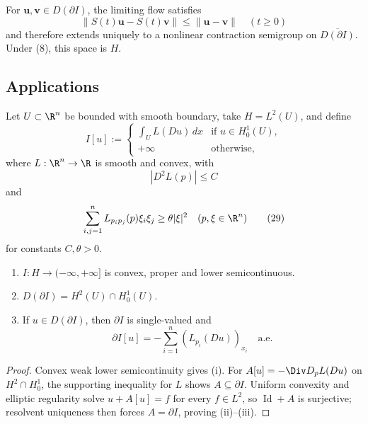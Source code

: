 \begin{remark}
\label{rem:gradient-flow-semigroup-extension}
For $\mathbf u,\mathbf v\in D(\partial I)$, the limiting flow satisfies
\[
\|S(t)\mathbf{u} - S(t)\mathbf{v}\| \leq \|\mathbf{u} - \mathbf{v}\| \quad (t \geq 0)
\]
and therefore extends uniquely to a nonlinear contraction semigroup on $\overline{D(\partial I)}$. Under (8), this space is $H$.
\end{remark}

\subsection{Applications}
\label{sec:gradient-flow-applications}

Let $U\subset\R^n$ be bounded with smooth boundary, take $H=L^2(U)$, and define
\[
I[u]:=
\begin{cases}
\displaystyle\int_U L(Du)\,dx & \text{if }u\in H_0^1(U),\\
+\infty & \text{otherwise},
\end{cases}
\tag{27}
\]
where $L:\R^n\to\R$ is smooth and convex, with
\[
|D^2L(p)|\leq C
\tag{28}
\]
and
\[
\sum_{i,j=1}^nL_{p_ip_j}(p)\xi_i\xi_j\geq\theta|\xi|^2
\quad(p,\xi\in\R^n)
\tag{29}
\]
for constants $C,\theta>0$.

\begin{theorem}
\label{thm:characterization-subdifferential-uniformly-convex-lagrangian}
\begin{enumerate}
\item[(i)] $I : H \to (-\infty, +\infty]$ is convex, proper and lower semicontinuous.
\item[(ii)] $D(\partial I) = H^2(U) \cap H_0^1(U)$.
\item[(iii)] If $u \in D(\partial I)$, then $\partial I$ is single-valued and
\[
\partial I[u] = -\sum_{i=1}^n (L_{p_i}(Du))_{x_i} \quad \text{a.e.}
\]
\end{enumerate}
\end{theorem}

\begin{proof}
\sketch Convex weak lower semicontinuity gives (i). For $A[u]=-\Div D_pL(Du)$ on $H^2\cap H_0^1$, the supporting inequality for $L$ shows $A\subseteq\partial I$. Uniform convexity and elliptic regularity solve $u+A[u]=f$ for every $f\in L^2$, so $\operatorname{Id}+A$ is surjective; resolvent uniqueness then forces $A=\partial I$, proving (ii)--(iii).
\end{proof}

